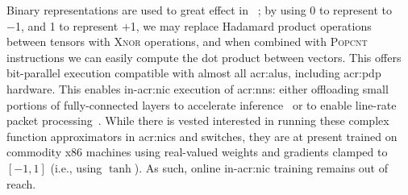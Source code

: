 Binary representations are used to great effect in ~\parencite{DBLP:journals/corr/MiyashitaLM16,DBLP:conf/eccv/RastegariORF16,DBLP:journals/corr/KimS16,DBLP:conf/nips/HubaraCSEB16}; by using 0 to represent to \num{-1}, and 1 to represent $+$\num{1}, we may replace Hadamard product operations between tensors with \textsc{Xnor} operations, and when combined with \textsc{Popcnt} instructions we can easily compute the dot product between vectors.
This offers bit-parallel execution compatible with almost all \glspl{acr:alu}, including \gls{acr:pdp} hardware.
This enables in-\gls{acr:nic} execution of \glspl{acr:nn}: either offloading small portions of fully-connected layers to accelerate inference~\parencite{DBLP:conf/sigcomm/SanvitoSB18} or to enable line-rate packet processing~\parencite{DBLP:journals/corr/abs-2009-02353,DBLP:journals/corr/abs-1801-05731}.
While there is vested interested in running these complex function approximators in \glspl{acr:nic} and switches, they are at present trained on commodity x86 machines using real-valued weights and gradients clamped to $\left[-1, 1\right]$ (i.e., using $\tanh$).
As such, online in-\gls{acr:nic} training remains out of reach.